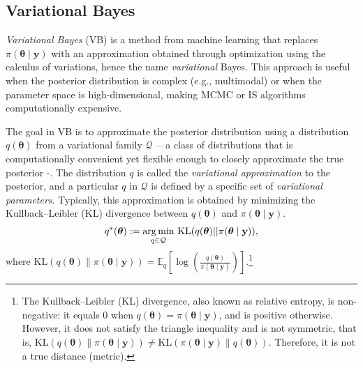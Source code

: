 \subsection{Variational Bayes}\label{sec15_22}
\textit{Variational Bayes} (VB) is a method from machine learning \cite{jordan1999introduction, wainwright2008graphical} that replaces $\pi(\boldsymbol{\theta} \mid \mathbf{y})$ with an approximation obtained through optimization using the calculus of variations, hence the name \textit{variational} Bayes. This approach is useful when the posterior distribution is complex (e.g., multimodal) or when the parameter space is high-dimensional, making MCMC or IS algorithms computationally expensive.

The goal in VB is to approximate the posterior distribution using a distribution $q(\boldsymbol{\theta})$ from a variational family $\mathcal{Q}$ —a class of distributions that is computationally convenient yet flexible enough to closely approximate the true posterior \cite{blei2017variational}-. The distribution $q$ is called the \textit{variational approximation} to the posterior, and a particular $q$ in $\mathcal{Q}$ is defined by a specific set of \textit{variational parameters}. Typically, this approximation is obtained by minimizing the Kullback–Leibler (KL) divergence between $q(\boldsymbol{\theta})$ and $\pi(\boldsymbol{\theta} \mid \mathbf{y})$.
\begin{align}\label{eq:VB1}
	q^*(\boldsymbol{\theta}):=\underset{q \in \mathcal{Q}}{\argmin} \  \text{KL}(q(\boldsymbol{\theta})||\pi(\boldsymbol{\theta} \mid \mathbf{y})),
\end{align}  
where $\text{KL}(q(\boldsymbol{\theta}) \| \pi(\boldsymbol{\theta} \mid \mathbf{y})) = \mathbb{E}_q\left[\log\left(\frac{q(\boldsymbol{\theta})}{\pi(\boldsymbol{\theta} \mid \mathbf{y})}\right)\right]$.\footnote{The Kullback–Leibler (KL) divergence, also known as relative entropy, is non-negative: it equals 0 when $q(\boldsymbol{\theta}) = \pi(\boldsymbol{\theta} \mid \mathbf{y})$, and is positive otherwise. However, it does not satisfy the triangle inequality and is not symmetric, that is, $\text{KL}(q(\boldsymbol{\theta}) \| \pi(\boldsymbol{\theta} \mid \mathbf{y})) \neq \text{KL}(\pi(\boldsymbol{\theta} \mid \mathbf{y}) \| q(\boldsymbol{\theta}))$. Therefore, it is not a true distance (metric).}

